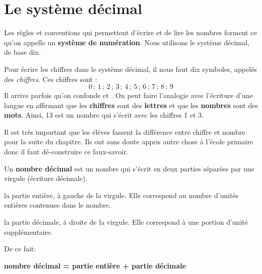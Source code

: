 \section{Le système décimal}

Les règles et conventions qui permettent d'écrire et de lire les nombres forment ce qu'on appelle un \textbf{système de numération}. Nous utilisons le système décimal, de base dix.

\begin{aconnaitre}
Pour écrire les chiffres dans le système décimal, il nous faut dix symboles, appelés des \emph{chiffres}. Ces chiffres sont :
\[ 0\,;\,1\,;\,2\,;\,3\,;\,4\,;\,5\,;\,6\,;\,7\,;\,8\,;\,9  \]
Il arrive parfois qu'on confonde \textbf{} et \textbf{}. On peut faire l'analogie avec l'écriture d'une langue en affirmant que les \textbf{\textcolor{H1}{chiffres}} sont des \textbf{\textcolor{H1}{lettres}} et que les \textbf{\textcolor{H1}{nombres}} sont des \textbf{\textcolor{H1}{mots}}. Ainsi, 13 est un nombre qui s'écrit avec les chiffres 1 et 3.
\end{aconnaitre}

\prof
{Il est très important que les élèves fassent la différence entre chiffre et nombre pour la suite du chapitre. Ils ont sans doute appris autre chose à l'école primaire donc il faut dé-construire ce faux-savoir.}

Un \textbf{\textcolor{C2}{nombre décimal}} est un nombre qui s'écrit en deux parties séparées par une virgule (écriture décimale).

\hspace{2em}\textbullet\hspace{.25em} la partie entière, à gauche de la virgule. Elle correspond au nombre d'unités entières contenues dans le nombre.

\hspace{2em}\textbullet\hspace{.25em} la partie décimale, à droite de la virgule. Elle correspond à une portion d'unité supplémentaire.

De ce fait:

\begin{center}
\textbf{\textcolor{C2}{nombre décimal = partie entière + partie décimale}}
\end{center}

